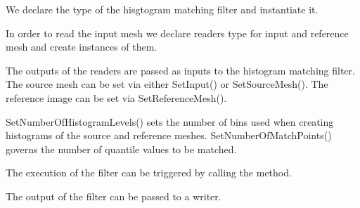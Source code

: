 \documentclass{InsightArticle}
\begin{document}
\begin{center}

\end{center}

We declare the type of the hisgtogram matching filter and instantiate it.

\begin{center}

\end{center}

In order to read the input mesh we declare readers type for input and reference mesh and create instances of them.

\begin{center}

\end{center}

The outputs of the readers are passed as inputs to the histogram matching filter.
The source mesh can be set via either SetInput() or SetSourceMesh().
The reference image can be set via SetReferenceMesh().

\begin{center}

\end{center}

SetNumberOfHistogramLevels() sets the number of bins used when
creating histograms of the source and reference meshes.
SetNumberOfMatchPoints() governs the number of quantile values to be matched.

\begin{center}

\end{center}

The execution of the filter can be triggered by calling the  method.

\begin{center}

\end{center}

The output of the filter can be passed to a writer. 

\begin{center}

\end{center}
\end{document}
